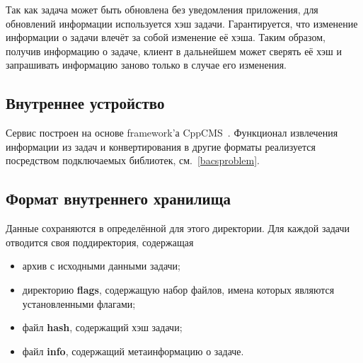 Так как задача может быть обновлена без уведомления приложения,
для обновлений информации используется хэш задачи.
Гарантируется, что изменение информации о задачи
влечёт за собой изменение её хэша. Таким образом,
получив информацию о задаче,
клиент в дальнейшем может сверять её хэш и запрашивать
информацию заново только в случае его изменения.

\subsection{Внутреннее устройство}
Сервис построен на основе framework'а CppCMS~\cite{cppcms}.
Функционал извлечения информации из задач и конвертирования
в другие форматы реализуется посредством подключаемых библиотек, см.~\ref{bacsproblem}.

\subsection{Формат внутреннего хранилища}
Данные сохраняются в определённой для этого директории.
Для каждой задачи отводится своя поддиректория, содержащая
\begin{itemize}
    \item архив с исходными данными задачи;
    \item директорию \textbf{flags}, содержащую набор файлов,
        имена которых являются установленными флагами;
    \item файл \textbf{hash}, содержащий хэш задачи;
    \item файл \textbf{info}, содержащий метаинформацию о задаче.
\end{itemize}
